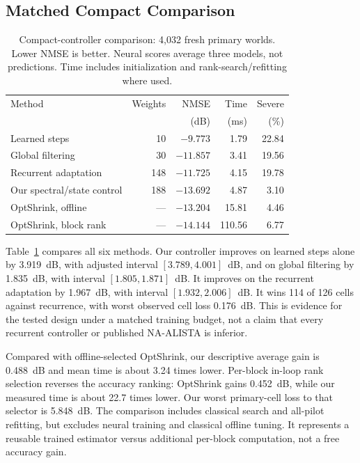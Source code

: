 \documentclass[10pt,journal,letterpaper]{IEEEtran}
\begin{document}
\subsection{Matched Compact Comparison}
\begin{table}[!t]
\caption{Compact-controller comparison: 4,032 fresh primary worlds. Lower NMSE is better. Neural scores average three models, not predictions. Time includes initialization and rank-search/refitting where used.}
\label{tab:compact}\centering\footnotesize\setlength{\tabcolsep}{3pt}
\begin{tabular}{@{}lrrrr@{}}\toprule
Method & Weights & NMSE & Time & Severe\\
 & & (dB) & (ms) & (\%)\\\midrule
Learned steps & 10 & $-9.773$ & 1.79 & 22.84\\
Global filtering & 30 & $-11.857$ & 3.41 & 19.56\\
Recurrent adaptation & 148 & $-11.725$ & 4.15 & 19.78\\
Our spectral/state control & 188 & $-13.692$ & 4.87 & 3.10\\
OptShrink, offline & --- & $-13.204$ & 15.81 & 4.46\\
OptShrink, block rank & --- & $-14.144$ & 110.56 & 6.77\\\bottomrule
\end{tabular}
\end{table}
Table~\ref{tab:compact} compares all six methods. Our controller improves on learned steps alone by 3.919~dB, with adjusted interval $[3.789,4.001]$~dB, and on global filtering by 1.835~dB, with interval $[1.805,1.871]$~dB. It improves on the recurrent adaptation by 1.967~dB, with interval $[1.932,2.006]$~dB. It wins 114 of 126 cells against recurrence, with worst observed cell loss 0.176~dB. This is evidence for the tested design under a matched training budget, not a claim that every recurrent controller or published NA-ALISTA is inferior.

Compared with offline-selected OptShrink, our descriptive average gain is 0.488~dB and mean time is about 3.24 times lower. Per-block in-loop rank selection reverses the accuracy ranking: OptShrink gains 0.452~dB, while our measured time is about 22.7 times lower. Our worst primary-cell loss to that selector is 5.848~dB. The comparison includes classical search and all-pilot refitting, but excludes neural training and classical offline tuning. It represents a reusable trained estimator versus additional per-block computation, not a free accuracy gain.
\end{document}
